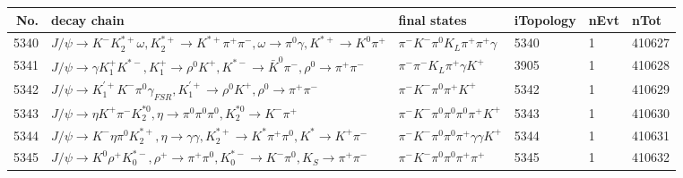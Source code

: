\begin{table}[htbp] 
\begin{center}
\begin{small}
\begin{tabular}{rlllll}\hline\hline
 No. & decay chain & final states &  iTopology & nEvt & nTot \\\hline
5340&$J/\psi       \rightarrow K^{-}          K_2^{*+}       \omega         , K_2^{*+}        \rightarrow K^{*+}         \pi^{+}        \pi^{-}        , \omega          \rightarrow \pi^{0}        \gamma       , K^{*+}          \rightarrow K^{0}          \pi^{+}        $&$\pi^{-}        K^{-}          \pi^{0}        K_{L}          \pi^{+}        \pi^{+}        \gamma       $& 5340&    1&410627\\
5341&$J/\psi       \rightarrow \gamma       K_1^{+}        K^{*-}         , K_1^{+}         \rightarrow \rho^{0}      K^{+}          , K^{*-}          \rightarrow \bar{K}^{0}   \pi^{-}        , \rho^{0}       \rightarrow \pi^{+}        \pi^{-}        $&$\pi^{-}        \pi^{-}        K_{L}          \pi^{+}        \gamma       K^{+}          $& 3905&    1&410628\\
5342&$J/\psi       \rightarrow K_1^{'+}      K^{-}          \pi^{0}        \gamma_{FSR} , K_1^{'+}       \rightarrow \rho^{0}      K^{+}          , \rho^{0}       \rightarrow \pi^{+}        \pi^{-}        $&$\pi^{-}        K^{-}          \pi^{0}        \pi^{+}        K^{+}          $& 5342&    1&410629\\
5343&$J/\psi       \rightarrow \eta          K^{+}          \pi^{-}        K_2^{*0}       , \eta           \rightarrow \pi^{0}        \pi^{0}        \pi^{0}        , K_2^{*0}        \rightarrow K^{-}          \pi^{+}        $&$\pi^{-}        K^{-}          \pi^{0}        \pi^{0}        \pi^{0}        \pi^{+}        K^{+}          $& 5343&    1&410630\\
5344&$J/\psi       \rightarrow K^{-}          \eta          \pi^{0}        K_2^{*+}       , \eta           \rightarrow \gamma       \gamma       , K_2^{*+}        \rightarrow K^{*}          \pi^{+}        \pi^{0}        , K^{*}           \rightarrow K^{+}          \pi^{-}        $&$\pi^{-}        K^{-}          \pi^{0}        \pi^{0}        \pi^{+}        \gamma       \gamma       K^{+}          $& 5344&    1&410631\\
5345&$J/\psi       \rightarrow K^{0}          \rho^{+}      K_{0}^{*-}     , \rho^{+}       \rightarrow \pi^{+}        \pi^{0}        , K_{0}^{*-}      \rightarrow K^{-}          \pi^{0}        , K_{S}           \rightarrow \pi^{+}        \pi^{-}        $&$\pi^{-}        K^{-}          \pi^{0}        \pi^{0}        \pi^{+}        \pi^{+}        $& 5345&    1&410632\\

\end{tabular}
\end{small}
\end{center}
\end{table}
